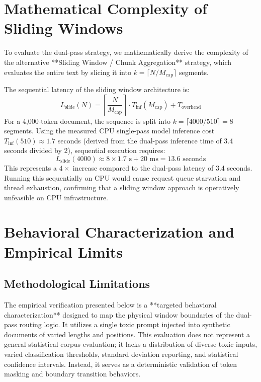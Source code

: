 \documentclass[10pt]{article}
\begin{document}
\section{Mathematical Complexity of Sliding Windows}
To evaluate the dual-pass strategy, we mathematically derive the complexity of the alternative **Sliding Window / Chunk Aggregation** strategy, which evaluates the entire text by slicing it into $k = \lceil N / M_{\text{cap}} \rceil$ segments.

The sequential latency of the sliding window architecture is:
\begin{equation}
L_{\text{slide}}(N) = \left\lceil \frac{N}{M_{\text{cap}}} \right\rceil \cdot T_{\text{inf}}(M_{\text{cap}}) + T_{\text{overhead}}
\end{equation}
For a 4,000-token document, the sequence is split into $k = \lceil 4000/510 \rceil = 8$ segments.
Using the measured CPU single-pass model inference cost $T_{\text{inf}}(510) \approx 1.7$ seconds (derived from the dual-pass inference time of 3.4 seconds divided by 2), sequential execution requires:
\begin{equation}
L_{\text{slide}}(4000) \approx 8 \times 1.7\text{ s} + 20\text{ ms} = 13.6\text{ seconds}
\end{equation}
This represents a $4\times$ increase compared to the dual-pass latency of 3.4 seconds. Running this sequentially on CPU would cause request queue starvation and thread exhaustion, confirming that a sliding window approach is operatively unfeasible on CPU infrastructure.

\section{Behavioral Characterization and Empirical Limits}

\subsection{Methodological Limitations}
The empirical verification presented below is a **targeted behavioral characterization** designed to map the physical window boundaries of the dual-pass routing logic. It utilizes a single toxic prompt injected into synthetic documents of varied lengths and positions. This evaluation does not represent a general statistical corpus evaluation; it lacks a distribution of diverse toxic inputs, varied classification thresholds, standard deviation reporting, and statistical confidence intervals. Instead, it serves as a deterministic validation of token masking and boundary transition behaviors.
\end{document}
